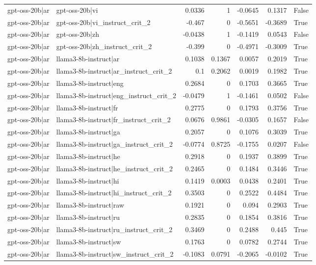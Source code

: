 \begin{table}
\begin{tabular}{l l r r r r l}
gpt-oss-20b|ar & gpt-oss-20b|vi & 0.0336 & 1 & -0.0645 & 0.1317 & False \\
gpt-oss-20b|ar & gpt-oss-20b|vi_instruct_crit_2 & -0.467 & 0 & -0.5651 & -0.3689 & True \\
gpt-oss-20b|ar & gpt-oss-20b|zh & -0.0438 & 1 & -0.1419 & 0.0543 & False \\
gpt-oss-20b|ar & gpt-oss-20b|zh_instruct_crit_2 & -0.399 & 0 & -0.4971 & -0.3009 & True \\
gpt-oss-20b|ar & llama3-8b-instruct|ar & 0.1038 & 0.1367 & 0.0057 & 0.2019 & True \\
gpt-oss-20b|ar & llama3-8b-instruct|ar_instruct_crit_2 & 0.1 & 0.2062 & 0.0019 & 0.1982 & True \\
gpt-oss-20b|ar & llama3-8b-instruct|eng & 0.2684 & 0 & 0.1703 & 0.3665 & True \\
gpt-oss-20b|ar & llama3-8b-instruct|eng_instruct_crit_2 & -0.0479 & 1 & -0.1461 & 0.0502 & False \\
gpt-oss-20b|ar & llama3-8b-instruct|fr & 0.2775 & 0 & 0.1793 & 0.3756 & True \\
gpt-oss-20b|ar & llama3-8b-instruct|fr_instruct_crit_2 & 0.0676 & 0.9861 & -0.0305 & 0.1657 & False \\
gpt-oss-20b|ar & llama3-8b-instruct|ga & 0.2057 & 0 & 0.1076 & 0.3039 & True \\
gpt-oss-20b|ar & llama3-8b-instruct|ga_instruct_crit_2 & -0.0774 & 0.8725 & -0.1755 & 0.0207 & False \\
gpt-oss-20b|ar & llama3-8b-instruct|he & 0.2918 & 0 & 0.1937 & 0.3899 & True \\
gpt-oss-20b|ar & llama3-8b-instruct|he_instruct_crit_2 & 0.2465 & 0 & 0.1484 & 0.3446 & True \\
gpt-oss-20b|ar & llama3-8b-instruct|hi & 0.1419 & 0.0003 & 0.0438 & 0.2401 & True \\
gpt-oss-20b|ar & llama3-8b-instruct|hi_instruct_crit_2 & 0.3503 & 0 & 0.2522 & 0.4484 & True \\
gpt-oss-20b|ar & llama3-8b-instruct|raw & 0.1921 & 0 & 0.094 & 0.2903 & True \\
gpt-oss-20b|ar & llama3-8b-instruct|ru & 0.2835 & 0 & 0.1854 & 0.3816 & True \\
gpt-oss-20b|ar & llama3-8b-instruct|ru_instruct_crit_2 & 0.3469 & 0 & 0.2488 & 0.445 & True \\
gpt-oss-20b|ar & llama3-8b-instruct|sw & 0.1763 & 0 & 0.0782 & 0.2744 & True \\
gpt-oss-20b|ar & llama3-8b-instruct|sw_instruct_crit_2 & -0.1083 & 0.0791 & -0.2065 & -0.0102 & True \\

\end{tabular}
\end{table}

